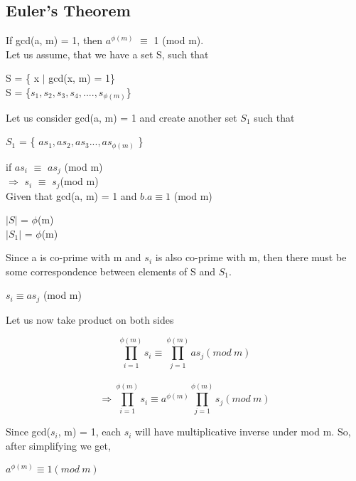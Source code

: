 \documentclass[11pt]{article}
\begin{document}
\begin{itemize}
    \subsection{Euler's Theorem}
    If gcd(a, m) = 1, then $a^{\phi(m)}$ $\equiv$ 1 (mod m).\\
    Let us assume, that we have a set S, such that
    \begin{center}
        S = \{ x $|$ gcd(x, m) = 1\}\\
        S = \{$s_1, s_2, s_3, s_4,....,s_{\phi(m)}$\}
    \end{center}
    Let us consider gcd(a, m) = 1 and create another set $S_1$ such that
    \begin{center}
        $S_1$ = \{ $as_1, as_2, as_3...,as_{\phi(m)}$ \}
    \end{center}
    if $as_i$ $\equiv$ $as_j$ (mod m)\\
    $\Rightarrow$ $s_i$ $\equiv$ $s_j$(mod m)\\
    Given that gcd(a, m) = 1 and $b.a \equiv 1 $ (mod m)
    \begin{center}
        $|S|$ = $\phi$(m)\\
        $|S_1|$ = $\phi$(m)
    \end{center}
    Since a is co-prime with m and $s_i$ is also co-prime with m, then there must be some correspondence between elements of S and $S_1$.\\
    \begin{center}
        $s_i \equiv as_j$ (mod m)
    \end{center}
    Let us now take product on both sides
    \begin{center}
        $$ \prod_{i=1}^{\phi(m)} s_i   \equiv  \prod_{j=1}^{\phi(m)} as_j  (mod\ m)$$ \\
        $$\Rightarrow \prod_{i=1}^{\phi(m)} s_i  \equiv  a^{\phi(m)}\prod_{j=1}^{\phi(m)} s_j  (mod\ m)$$
    \end{center}
    Since gcd($s_i$, m) = 1, each $s_i$ will have multiplicative inverse under mod m. So, after simplifying we get,
    \begin{center}
        $a^{\phi(m)} \equiv 1 ( mod\ m)$
    \end{center}

\end{itemize}
\end{document}
